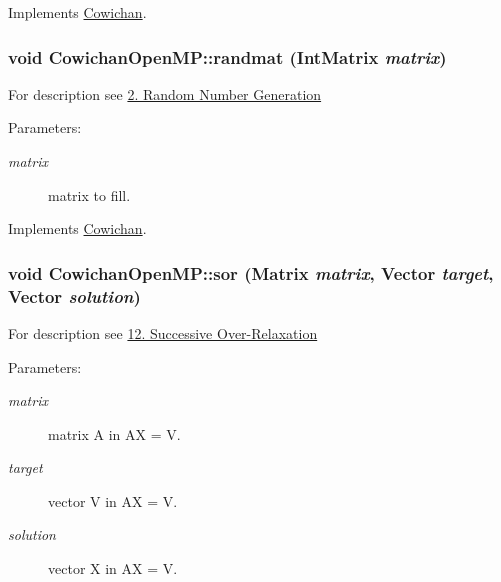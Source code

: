 Implements \hyperlink{class_cowichan_3d7d4b581a1d6f0392dc452830fb3b03}{Cowichan}.\hypertarget{class_cowichan_open_m_p_2c7c4e4dd96f82b7280a412c1fceed2c}{
\subsubsection[{randmat}]{\setlength{\rightskip}{0pt plus 5cm}void CowichanOpenMP::randmat ({\bf IntMatrix} {\em matrix})}}
\label{class_cowichan_open_m_p_2c7c4e4dd96f82b7280a412c1fceed2c}


For description see \hyperlink{index_randmat_sec}{2. Random Number Generation} \begin{Desc}
\item[Parameters:]
\begin{description}
\item[{\em matrix}]matrix to fill. \end{description}
\end{Desc}


Implements \hyperlink{class_cowichan_c44cacf9d9e363a5b076bcee8b9a7a73}{Cowichan}.\hypertarget{class_cowichan_open_m_p_d6482d0369a26a51ef0e37ab238fc664}{
\subsubsection[{sor}]{\setlength{\rightskip}{0pt plus 5cm}void CowichanOpenMP::sor ({\bf Matrix} {\em matrix}, \/  {\bf Vector} {\em target}, \/  {\bf Vector} {\em solution})}}
\label{class_cowichan_open_m_p_d6482d0369a26a51ef0e37ab238fc664}


For description see \hyperlink{index_sor_sec}{12. Successive Over-Relaxation} \begin{Desc}
\item[Parameters:]
\begin{description}
\item[{\em matrix}]matrix A in AX = V. \item[{\em target}]vector V in AX = V. \item[{\em solution}]vector X in AX = V. \end{description}
\end{Desc}


